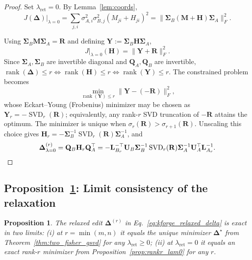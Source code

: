 \documentclass[11pt]{article}
\newtheorem{proposition}{Proposition}
\begin{document}
\begin{proof}
Set $\lambda_{\mathrm{ret}}=0$. By Lemma~\ref{lem:coords},
\[
J(\mathbf{\Delta})\big|_{\lambda=0}
= \sum_{j,i}\sigma_{A,i}^2\sigma_{B,j}^2(M_{ji}+H_{ji})^2
= \lVert\mathbf{\Sigma}_B(\mathbf{M}+\mathbf{H})\mathbf{\Sigma}_A\rVert_F^2.
\]


Using $\mathbf{\Sigma}_B\mathbf{M}\mathbf{\Sigma}_A = \mathbf{R}$ and defining $\mathbf{Y} := \mathbf{\Sigma}_B\mathbf{H}\mathbf{\Sigma}_A$,
\[
J|_{\lambda=0}(\mathbf{H}) = \lVert\mathbf{Y}+\mathbf{R}\rVert_F^2.
\]
Since $\mathbf{\Sigma}_A,\mathbf{\Sigma}_B$ are invertible diagonal and $\mathbf{Q}_A,\mathbf{Q}_B$ are invertible, $\operatorname{rank}(\mathbf{\Delta})\le r \Leftrightarrow \operatorname{rank}(\mathbf{H})\le r \Leftrightarrow \operatorname{rank}(\mathbf{Y})\le r$. The constrained problem becomes
\[
\min_{\operatorname{rank}(\mathbf{Y})\le r}\lVert\mathbf{Y} - (-\mathbf{R})\rVert_F^2,
\]
whose Eckart--Young (Frobenius) minimizer may be chosen as $\mathbf{Y}_r=-\operatorname{SVD}_r(\mathbf{R})$; equivalently, any rank-$r$ SVD truncation of $-\mathbf{R}$ attains the optimum. The minimizer is unique when $\sigma_r(\mathbf{R}) > \sigma_{r+1}(\mathbf{R})$. Unscaling this choice gives $\mathbf{H}_r = -\mathbf{\Sigma}_B^{-1}\operatorname{SVD}_r(\mathbf{R})\mathbf{\Sigma}_A^{-1}$, and
\[
\mathbf{\Delta}^{(r)}_{\lambda=0} = \mathbf{Q}_B\mathbf{H}_r\mathbf{Q}_A^\top = -\mathbf{L}_{B_r}^{-\top}\mathbf{U}_B\mathbf{\Sigma}_B^{-1}\operatorname{SVD}_r(\mathbf{R})\mathbf{\Sigma}_A^{-1}\mathbf{U}_A^\top\mathbf{L}_{A_r}^{-1}. \qedhere
\]
\end{proof}

\subsection{Proposition~\ref{prop:limit_consistency}: Limit consistency of the relaxation}

\begin{proposition}
\label{prop:limit_consistency}
The relaxed edit $\mathbf{\Delta}^{(r)}$ in Eq.~\ref{eq:kforge_relaxed_delta} is exact in two limits: (i) at $r=\min(m,n)$ it equals the unique minimizer $\mathbf{\Delta}^\star$ from Theorem~\ref{thm:two_fisher_gsvd} for any $\lambda_{\mathrm{ret}}\ge 0$; (ii) at $\lambda_{\mathrm{ret}}=0$ it equals an exact rank-$r$ minimizer from Proposition~\ref{prop:rankr_lam0} for any $r$.
\end{proposition}
\end{document}
